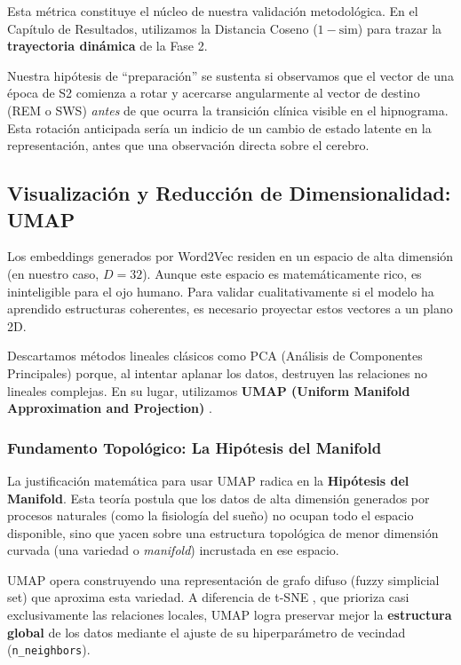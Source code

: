 Esta métrica constituye el núcleo de nuestra validación metodológica. En el Capítulo de Resultados, utilizamos la Distancia Coseno ($1 - \text{sim}$) para trazar la \textbf{trayectoria dinámica} de la Fase 2.

Nuestra hipótesis de ``preparación'' se sustenta si observamos que el vector de una época de S2 comienza a rotar y acercarse angularmente al vector de destino (REM o SWS) \textit{antes} de que ocurra la transición clínica visible en el hipnograma. Esta rotación anticipada sería un indicio de un cambio de estado latente en la representación, antes que una observación directa sobre el cerebro.

\subsection{Visualización y Reducción de Dimensionalidad: UMAP}

Los embeddings generados por Word2Vec residen en un espacio de alta dimensión (en nuestro caso, $D=32$). Aunque este espacio es matemáticamente rico, es ininteligible para el ojo humano. Para validar cualitativamente si el modelo ha aprendido estructuras coherentes, es necesario proyectar estos vectores a un plano 2D.

Descartamos métodos lineales clásicos como PCA (Análisis de Componentes Principales) porque, al intentar aplanar los datos, destruyen las relaciones no lineales complejas. En su lugar, utilizamos \textbf{UMAP (Uniform Manifold Approximation and Projection)} \cite{mcinnes2018umap}.

\subsubsection{Fundamento Topológico: La Hipótesis del Manifold}

La justificación matemática para usar UMAP radica en la \textbf{Hipótesis del Manifold}. Esta teoría postula que los datos de alta dimensión generados por procesos naturales (como la fisiología del sueño) no ocupan todo el espacio disponible, sino que yacen sobre una estructura topológica de menor dimensión curvada (una variedad o \textit{manifold}) incrustada en ese espacio.

UMAP opera construyendo una representación de grafo difuso (fuzzy simplicial set) que aproxima esta variedad. A diferencia de t-SNE \cite{van2008visualizing}, que prioriza casi exclusivamente las relaciones locales, UMAP logra preservar mejor la \textbf{estructura global} de los datos mediante el ajuste de su hiperparámetro de vecindad (\texttt{n\_neighbors}).

